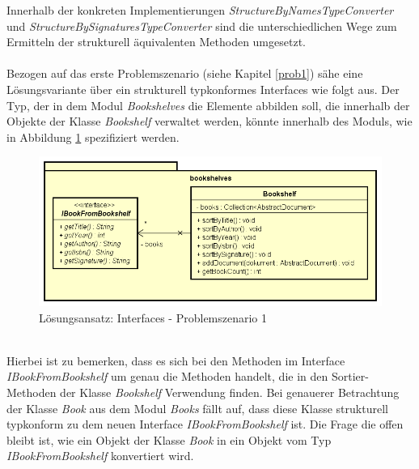 \documentclass[11pt, 
ngerman,
doublespacing,
chapterinoneline, %
consistentlayout, %
]{scrartcl}
\begin{document}
Innerhalb der konkreten Implementierungen \emph{StructureByNamesTypeConverter} und \emph{StructureBySignaturesTypeConverter} sind die un\-terschiedlichen Wege zum Ermitteln der strukturell äquivalenten Methoden umgesetzt.\\\\
Bezogen auf das erste Problemszenario (siehe Kapitel \ref{prob1}) sähe eine Lösungsvariante über ein strukturell typkonformes Interfaces wie folgt aus. Der Typ, der in dem Modul \emph{Bookshelves} die Elemente abbilden soll, die innerhalb der Objekte der Klasse \emph{Bookshelf} verwaltet werden, könnte innerhalb des Moduls, wie in Abbildung \ref{solveInterface_PS1} spezifiziert werden.
\begin{figure}[h]
\centering
\includegraphics[scale=0.5]{pics/loesung_s1_interface.png}
\caption{Lösungsansatz: Interfaces - Problemszenario 1}
\label{solveInterface_PS1}
\end{figure}\\
Hierbei ist zu bemerken, dass es sich bei den Methoden im Interface \emph{IBookFromBookshelf} um genau die Methoden handelt, die in den Sortier-Methoden der Klasse \emph{Bookshelf} Verwendung finden. Bei genauerer Betrachtung der Klasse \emph{Book} aus dem Modul \emph{Books} fällt auf, dass diese Klasse strukturell typkonform zu dem neuen Interface \linebreak\emph{IBookFromBookshelf} ist. Die Frage die offen bleibt ist, wie ein Objekt der Klasse \emph{Book} in ein Objekt vom Typ \emph{IBookFromBookshelf} konvertiert wird.\\\\
\end{document}
